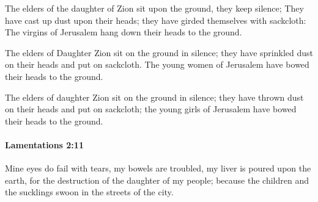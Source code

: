 			\begin{versebox}
					\item[BHS] 
					\item[LXX] 
					\item[ASV] The elders of the daughter of Zion sit upon the ground, they keep silence; They have cast up dust upon their heads; they have girded themselves with sackcloth: The virgins of Jerusalem hang down their heads to the ground.
					\item[NIV] The elders of Daughter Zion sit on the ground in silence; they have sprinkled dust on their heads and put on sackcloth. The young women of Jerusalem have bowed their heads to the ground.
					\item[NRSV] The elders of daughter Zion sit on the ground in silence; they have thrown dust on their heads and put on sackcloth; the young girls of Jerusalem have bowed their heads to the ground.
			\end{versebox}

		\paragraph{Lamentations 2:11} %
			\label{LAMENTATIONS-2-11}

			Mine eyes do fail with tears, my bowels are troubled, my liver is poured upon the earth, for the destruction of the daughter of my people; because the children and the sucklings swoon in the streets of the city.

